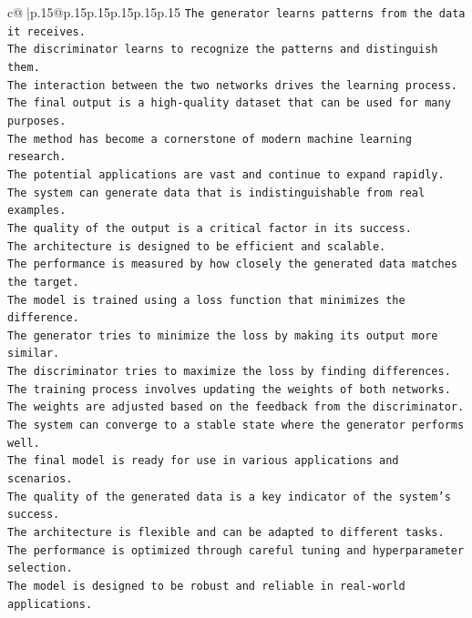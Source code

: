 \documentclass{article}
\begin{document}
{\begin{supertabular}{c@{$\;$}|p{.15\linewidth}@{}p{.15\linewidth}p{.15\linewidth}p{.15\linewidth}p{.15\linewidth}p{.15\linewidth}}
{{{\texttt{The generator learns patterns from the data it receives.  } \\
\texttt{The discriminator learns to recognize the patterns and distinguish them.  } \\
\texttt{The interaction between the two networks drives the learning process.  } \\
\texttt{The final output is a high{-}quality dataset that can be used for many purposes.  } \\
\texttt{The method has become a cornerstone of modern machine learning research.  } \\
\texttt{The potential applications are vast and continue to expand rapidly.  } \\
\texttt{The system can generate data that is indistinguishable from real examples.  } \\
\texttt{The quality of the output is a critical factor in its success.  } \\
\texttt{The architecture is designed to be efficient and scalable.  } \\
\texttt{The performance is measured by how closely the generated data matches the target.  } \\
\texttt{The model is trained using a loss function that minimizes the difference.  } \\
\texttt{The generator tries to minimize the loss by making its output more similar.  } \\
\texttt{The discriminator tries to maximize the loss by finding differences.  } \\
\texttt{The training process involves updating the weights of both networks.  } \\
\texttt{The weights are adjusted based on the feedback from the discriminator.  } \\
\texttt{The system can converge to a stable state where the generator performs well.  } \\
\texttt{The final model is ready for use in various applications and scenarios.  } \\
\texttt{The quality of the generated data is a key indicator of the system's success.  } \\
\texttt{The architecture is flexible and can be adapted to different tasks.  } \\
\texttt{The performance is optimized through careful tuning and hyperparameter selection.  } \\
\texttt{The model is designed to be robust and reliable in real{-}world applications.  } \\
}}}
\end{supertabular}}
\end{document}
